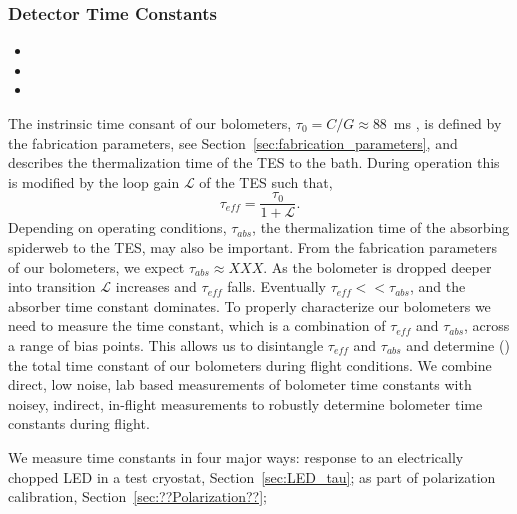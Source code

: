 \documentclass[../EBEXPaper2.tex]{subfiles}
\begin{document}
\subsubsection{Detector Time Constants}
\label{sec:time_constants}

\begin{itemize}
\item {}
\item {}
\item {}
\end{itemize}


The instrinsic time consant of our bolometers, $\tau_0 = C/G \approx 88$~ms , 
is defined by the fabrication parameters, see 
Section~\ref{sec:fabrication_parameters}, and describes the thermalization time of the TES to the bath.  
During operation this is modified by the loop gain $\mathcal{L}$ of the TES such that, 
$$\tau_{eff}= \frac{\tau_0}{1+\mathcal{L}}.$$
\cite{aubin_thesis}
Depending on operating conditions, $\tau_{abs}$, the thermalization time of the absorbing spiderweb to the TES, may also be 
important.  From the fabrication parameters of our bolometers, we expect $\tau_{abs} \approx XXX$.  As the bolometer is 
dropped deeper into transition $\mathcal{L}$ increases and $\tau_{eff}$ falls.  Eventually $\tau_{eff} << \tau_{abs}$, and the 
absorber time constant dominates.  To properly characterize our bolometers we need to measure the time constant, which is a 
combination of $\tau_{eff}$ and $\tau_{abs}$, across a range of bias points.  This allows us to disintangle $\tau_{eff}$ and 
$\tau_{abs}$ and determine () the total time constant of our bolometers during flight conditions. We combine direct, 
low noise, lab based measurements of bolometer time constants with noisey, indirect, in-flight measurements to robustly 
determine bolometer time constants during flight. 

We measure time constants in four major ways: response to an electrically chopped \ac{LED} in a test cryostat, Section~\ref{sec:LED_tau}; as part of polarization calibration, Section~\ref{sec:??Polarization??}; 
\end{document}
